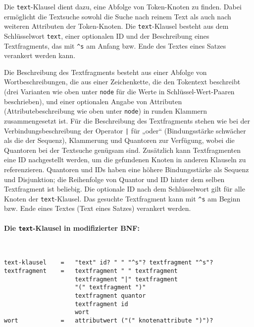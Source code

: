 \documentclass[12pt]{scrartcl}
\begin{document}
Die \texttt{text}-Klausel dient dazu, eine Abfolge von Token-Knoten zu finden. Dabei ermöglicht die Textsuche sowohl die Suche nach reinem Text als auch nach weiteren Attributen der Token-Knoten.
Die \texttt{text}-Klausel besteht aus dem Schlüsselwort \texttt{text}, einer optionalen ID und der Beschreibung eines Textfragments, das mit \texttt{\^{}s} am Anfang bzw. Ende des Textes eines Satzes verankert werden kann.

Die Beschreibung des Textfragments besteht aus einer Abfolge von Wortbeschreibungen, die aus einer Zeichenkette, die den Tokentext beschreibt (drei Varianten wie oben unter \texttt{node} für die Werte in Schlüssel-Wert-Paaren beschrieben), und einer optionalen Angabe von Attributen (Attributebeschreibung wie oben unter \texttt{node}) in runden Klammern zusammengesetzt ist.
Für die Beschreibung des Textfragments stehen wie bei der Verbindungsbeschreibung der Operator \texttt{|} für „oder“ (Bindungsstärke schwächer als die der Sequenz), Klammerung und Quantoren zur Verfügung, wobei die Quantoren bei der Textsuche genügsam sind. Zusätzlich kann Textfragmenten eine ID nachgestellt werden, um die gefundenen Knoten in anderen Klauseln zu referenzieren. Quantoren und IDs haben eine höhere Bindungsstärke als Sequenz und Disjunktion; die Reihenfolge von Quantor und ID hinter dem selben Textfragment ist beliebig. Die optionale ID nach dem Schlüsselwort gilt für alle Knoten der \texttt{text}-Klausel. Das gesuchte Textfragment kann mit \texttt{\^{}s} am Beginn bzw. Ende eines Textes (Text eines Satzes) verankert werden.

\paragraph*{Die \texttt{text}-Klausel in modifizierter BNF:}
~
\begin{framed}
\begin{lstlisting}
text-klausel    =   "text" id? " " "^s"? textfragment "^s"?
textfragment    =   textfragment " " textfragment
                    textfragment "|" textfragment
                    "(" textfragment ")"
                    textfragment quantor
                    textfragment id
                    wort
wort            =   attributwert ("(" knotenattribute ")")?
\end{lstlisting}
\end{framed}
\end{document}
